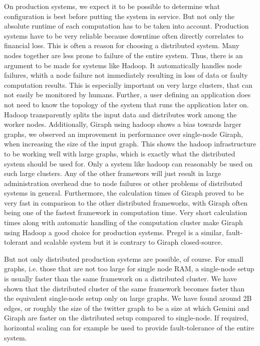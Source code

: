 On production systems, we expect it to be possible to determine what configuration is best before putting the system in service.
But not only the absolute runtime of each computation has to be taken into account. Production systems have to be very reliable because downtime often directly correlates to financial loss.
This is often a reason for choosing a distributed system. Many nodes together are less prone to failure of the entire system.
Thus, there is an argument to be made for systems like Hadoop.
It automatically handles node failures, whith a node failure not immediately resulting in loss of data or faulty computation results.
This is especially important on very large clusters, that can not easily be monitored by humans.
Further, a user defining an application does not need to know the topology of the system that runs the application later on.
Hadoop transparently splits the input data and distributes work among the worker nodes.
Additionally, Giraph using hadoop shows a bias towards larger graphs, we observed an improvement in performance over single-node Giraph, when increasing the size of the input graph.
This shows the hadoop infrastructure to be working well with large graphs, which is exactly what the distributed system should be used for. 
Only a system like hadoop can reasonably be used on such large clusters.
Any of the other framewors will just result in large administration overhead due to node failures or other problems of distributed systems in general.
Furthermore, the calculation times of Giraph proved to be very fast in comparison to the other distributed frameworks, with Giraph often being one of the fastest framework in computation time.
Very short calculation times along with automatic handling of the computation cluster make Giraph using Hadoop a good choice for production systems.
Pregel is a similar, fault-tolerant and scalable system but it is contrary to Giraph closed-source.

But not only distributed production systems are possible, of course. 
For small graphs, i.e. those that are not too large for single node RAM, a single-node setup is usually faster than the same framework on a distributed cluster. 
We have shown that the distributed cluster of the same framework becomes faster than the equivalent single-node setup only on large graphs.
We have found around 2B edges, or roughly the size of the twitter graph to be a size at which Gemini and Giraph are faster on the distributed setup compared to single-node.
If required, horizontal scaling can for example be used to provide fault-tolerance of the entire system.

